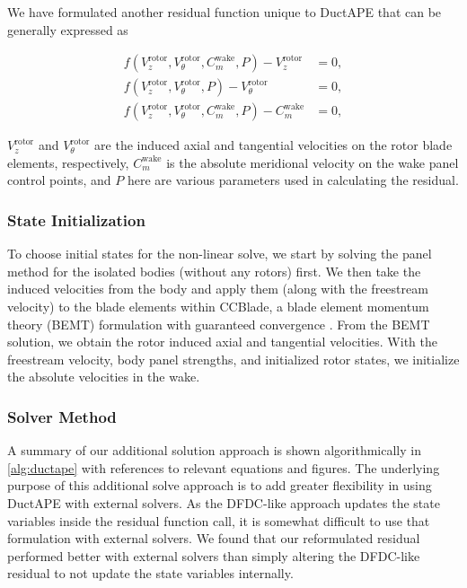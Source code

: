 We have formulated another residual function unique to DuctAPE that can be generally expressed as

\begin{subequations}
    \label{eqn:dtresid}
    \begin{align}
        f\left(V^\text{rotor}_z, V^\text{rotor}_{\theta}, C^\text{wake}_m, P\right) - V^\text{rotor}_z &= 0, \\
        f\left(V^\text{rotor}_z, V^\text{rotor}_{\theta}, P\right) - V^\text{rotor}_{\theta} &= 0, \\
        f\left(V^\text{rotor}_z, V^\text{rotor}_{\theta}, C^\text{wake}_m, P\right) - C^\text{wake}_m &= 0,
    \end{align}
\end{subequations}

\where \(V^\text{rotor}_z\) and \(V^\text{rotor}_{\theta}\) are the induced axial and tangential velocities on the rotor blade elements, respectively, \(C^\text{wake}_m\) is the absolute meridional velocity on the wake panel control points, and \(P\) here are various parameters used in calculating the residual.

\subsubsection{State Initialization}
\label{sssec:dtinit}

To choose initial states for the non-linear solve, we start by solving the panel method for the isolated bodies (without any rotors) first.
%
We then take the induced velocities from the body and apply them (along with the freestream velocity) to the blade elements within CCBlade, a blade element momentum theory (BEMT) formulation with guaranteed convergence . %
%
From the BEMT solution, we obtain the rotor induced axial and tangential velocities.
%
With the freestream velocity, body panel strengths, and initialized rotor states, we initialize the absolute velocities in the wake.


\subsubsection{Solver Method}
\label{sssec:dtsolve}

A summary of our additional solution approach is shown algorithmically in \cref{alg:ductape} with references to relevant equations and figures.
%
The underlying purpose of this additional solve approach is to add greater flexibility in using DuctAPE with external solvers.
%
As the DFDC-like approach updates the state variables inside the residual function call, it is somewhat difficult to use that formulation with external solvers.
%
We found that our reformulated residual performed better with external solvers than simply altering the DFDC-like residual to not update the state variables internally.
%

